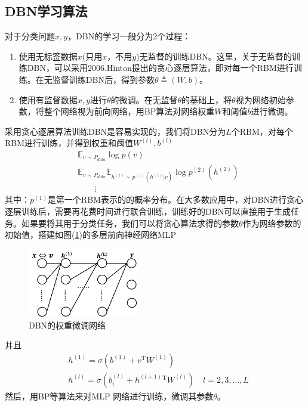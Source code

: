     \subsection{DBN学习算法}
        \par
        对于分类问题$x,y$，DBN的学习一般分为2个过程：
        \begin{enumerate}
        \item 使用无标签数据$x$(只用$x$，不用$y$)无监督的训练DBN。这里，关于无监督的训练DBN，可以采用2006.Hinton提出的贪心逐层算法，即对每一个RBM进行训练。在无监督训练DBN后，得到参数$\theta\triangleq (W,b)$。
        \item 使用有监督数据$x,y$进行$\theta$的微调。在无监督$\theta$的基础上，将$\theta$视为网络初始参数，将整个网络视为前向网络，用BP算法对网络权重$W$和阈值$b$进行微调。
        \end{enumerate}
        \par
        采用贪心逐层算法训练DBN是容易实现的，我们将DBN分为$L$个RBM，对每个RBM进行训练，并得到权重和阈值$W^{(l)},b^{(l)}$
        \begin{align*}
        & \mathbb{E} _{v\sim P_{data}} \log p(v)\\
        & \mathbb{ E}_{v\sim P_{data}} \mathbb{E}_{h^{(1)}\sim p^{(1)}(h^{(1)}|v)} \log p^{(2)}(h^{(2)})\\
        & \qquad \vdots
        \end{align*}
        其中：$p^{(1)}$是第一个RBM表示的的概率分布。在大多数应用中，对DBN进行贪心逐层训练后，需要再花费时间进行联合训练，训练好的DBN可以直接用于生成任务。如果要将其用于分类任务，我们可以将贪心算法求得的参数$\theta$作为网络参数的初始值，搭建如图(\ref{fig:DBN的权重微调网络})的多层前向神经网络MLP
            \begin{figure}[H]
            \centering
            \includegraphics[height=3cm]{images/DBN_Weighted_Micro_Transformation_Net.jpg}
            \caption{DBN的权重微调网络}
            \label{fig:DBN的权重微调网络}
            \end{figure}
        并且
        \begin{align*}
        & h^{(1)} = \sigma \left( b^{(1)} + v^\mathrm{T}W^{(1)} \right) \\
        & h^{(l)} = \sigma \left( b_i^{(l)} + h^{(l+1)}{}^\mathrm{T} W^{(l)} \right) \quad l = 2,3,\dots,L
        \end{align*}
        然后，用BP等算法来对MLP 网络进行训练，微调其参数$\theta$。


